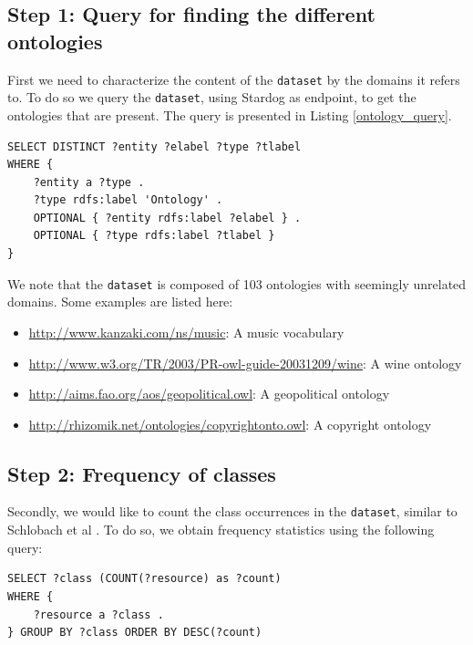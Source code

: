 \documentclass[runningheads,a4paper]{../../StyleFiles/llncs}
\begin{document}
\subsection{Step 1: Query for finding the different ontologies}
First we need to characterize the content of the \texttt{dataset} by the domains it refers to. To do so we query the \texttt{dataset}, using Stardog as endpoint, to get the ontologies that are present. The query is presented in Listing \ref{ontology_query}.

\begin{lstlisting}[captionpos=b, caption=SPARQL query for getting different Ontologies in the \texttt{dataset}, label=lst:sparql, basicstyle=\ttfamily\small,frame=bt]
SELECT DISTINCT ?entity ?elabel ?type ?tlabel 
WHERE { 
	?entity a ?type .
	?type rdfs:label 'Ontology' .
	OPTIONAL { ?entity rdfs:label ?elabel } . 
	OPTIONAL { ?type rdfs:label ?tlabel } 
}
\end{lstlisting}
\label{ontology_query}

We note that the \texttt{dataset} is composed of 103 ontologies with seemingly unrelated domains. Some examples are listed here:

\begin{itemize}
	\item \url{http://www.kanzaki.com/ns/music}: A music vocabulary
	\item \url{http://www.w3.org/TR/2003/PR-owl-guide-20031209/wine}: A wine ontology
	\item \url{http://aims.fao.org/aos/geopolitical.owl}: A geopolitical ontology
	\item \url{ http://rhizomik.net/ontologies/copyrightonto.owl}: A copyright ontology
\end{itemize}

\subsection{Step 2: Frequency of classes}
Secondly, we would like to count the class occurrences in the \texttt{dataset}, similar to Schlobach et al \cite{schlobach2007anytime}. To do so, we obtain frequency statistics using the following query:

\begin{lstlisting}[captionpos=b, caption=SPARQL query for getting class frequencies, label=lst:sparql, basicstyle=\ttfamily\small,frame=bt]
SELECT ?class (COUNT(?resource) as ?count) 
WHERE {
	?resource a ?class . 
} GROUP BY ?class ORDER BY DESC(?count)
\end{lstlisting}
\end{document}
